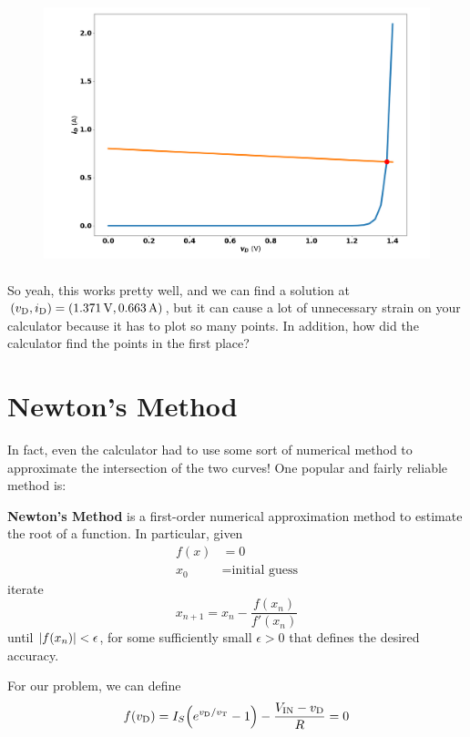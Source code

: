 \documentclass{article}
\begin{document}
\begin{figure}[H]
  \centering
  \includegraphics[height=3in]{plot.png}
\end{figure}

So yeah, this works pretty well, and we can find a solution at $(v_\text{D}, i_\text{D}) = (\SI{1.371}{\volt}, \SI{0.663}{\ampere})$, 
but it can cause a lot of unnecessary strain on your calculator because it has to plot so many points.
In addition, how did the calculator find the points in the first place?

\clearpage
\section{Newton's Method}
In fact, even the calculator had to use some sort of numerical method to approximate the intersection of the two curves! 
One popular and fairly reliable method is:

\begin{definition}
  \textbf{Newton's Method} is a first-order numerical approximation method to estimate the root of a function.
  In particular, given 
  \begin{align}
    f(x) &= 0 \\
    x_0 &= \text{initial guess}
  \end{align}
  iterate
  \begin{equation}
    x_{n+1} = x_n - \frac{f(x_n)}{f'(x_n)}
  \end{equation}
  until $\abs{f(x_n)} < \epsilon$, for some sufficiently small $\epsilon > 0$ that defines the desired accuracy.
\end{definition}

For our problem, we can define
\begin{equation}
  f(\vd) = I_S\pa{
    e^{\vd/\vt} - 1
  } - \frac{
    \VIN - \vd
  }{
    R
  } = 0
\end{equation}
\end{document}
